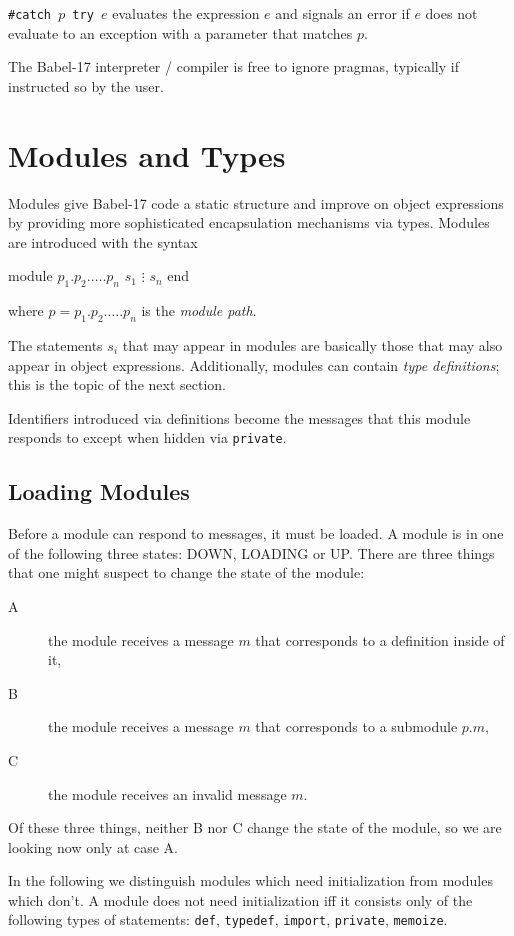 \documentclass[11pt]{amsart}
\newcommand{\babelsrc}[1] {\lstinline!#1!}
\begin{document}
\texttt{\#catch $p$ try $e$} evaluates the expression $e$ and signals an error if $e$ does not evaluate to an exception with a parameter that matches $p$.


The Babel-17 interpreter / compiler is free to ignore pragmas, typically if instructed so by the user. 

\section{Modules and Types}\label{modules}
Modules give Babel-17 code a static structure and improve on object expressions by providing more sophisticated encapsulation mechanisms via types. Modules are introduced with the syntax
\begin{babellisting}
module $p_1.p_2.\ldots.p_n$
  $s_1$
  $\vdots$
  $s_n$  
end
\end{babellisting}
where $p = p_1.p_2.\ldots.p_n$ is the \emph{module path}. 

The statements $s_i$ that may appear in modules are basically those that may also appear in object expressions. Additionally, modules can contain \emph{type definitions}; this is the topic of the next section. 

Identifiers introduced via definitions become the messages that this module responds to except when hidden via \babelsrc{private}. 

\subsection{Loading Modules}
Before a module can respond to messages, it must be loaded. 
A module is in one of the following three states: DOWN, LOADING or UP. There are three things that one might  suspect to change the state of the module: 
\begin{description}
\item[A] the module receives a message $m$ that corresponds to a definition inside of it,
\item[B] the module receives a message $m$ that corresponds to a submodule $p.m$,
\item[C] the module receives an invalid message $m$.
\end{description}
Of these three things, neither B nor C change the state of the module, so we are looking now only at case A.

In the following we distinguish modules which need initialization from modules which don't. A module does not need initialization iff it consists only of the following types of statements: \babelsrc{def}, \babelsrc{typedef}, \babelsrc{import}, \babelsrc{private}, \babelsrc{memoize}. 
\end{document}
